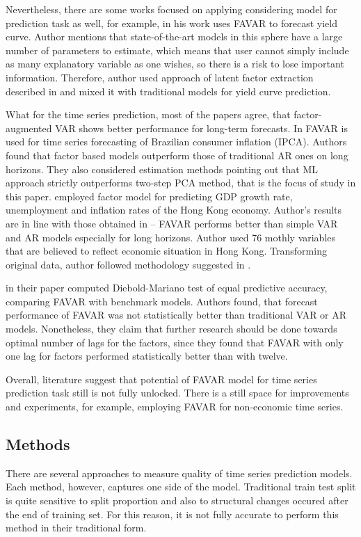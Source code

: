 \documentclass[a4paper, 14pt]{article}
\begin{document}
Nevertheless, there are some works focused on applying considering model for prediction task as well, for example,  \cite{monch2008forecasting} in his work uses FAVAR to forecast yield curve. Author mentions that state-of-the-art models in this sphere have a large number of parameters to estimate, which means that user cannot simply include as many explanatory variable as one wishes, so there is a risk to lose important information. Therefore, author used approach of latent factor extraction described in \cite{bernanke2005measuring} and mixed it with traditional models for yield curve prediction. 

What for the time series prediction, most of the papers agree, that factor-augmented VAR shows better performance for long-term forecasts. In \cite{figueiredo2013forecasting} FAVAR is used for time series forecasting of Brazilian consumer inflation (IPCA). Authors found that factor based models outperform those of traditional AR ones on long horizons. They also considered estimation methods pointing out that ML approach strictly outperforms two-step PCA method, that is the focus of study in this paper. \cite{pang2010forecasting} employed factor model for predicting GDP growth rate, unemployment and inflation rates of the Hong Kong economy. Author's results are in line with those obtained in \cite{figueiredo2013forecasting} -- FAVAR performs better than simple VAR and AR models especially for long horizons. Author used 76 mothly variables that are believed to reflect economic situation in Hong Kong. Transforming original data, author followed methodology suggested in \cite{stock2005implications}.

\cite{berggren2016can} in their paper computed Diebold-Mariano test of equal predictive accuracy, comparing FAVAR with benchmark models. Authors found, that forecast performance of FAVAR was not statistically better than traditional VAR or AR models. Nonetheless, they claim that further research should be done towards optimal number of lags for the factors, since they found that FAVAR with only one lag for factors performed statistically better than with twelve.  

Overall, literature suggest that potential of FAVAR model for time series prediction task still is not fully unlocked. There is a still space for improvements and experiments, for example, employing FAVAR for non-economic time series.

\subsection{Methods}
There are several approaches to measure quality of time series prediction models. Each method, however, captures one side of the model. Traditional train test split is quite sensitive to split proportion and also to structural changes occured after the end of training set. For this reason, it is not fully accurate to perform this method in their traditional form. 
\end{document}
